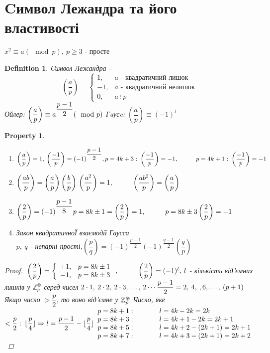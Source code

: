 \documentclass[a4paper,12pt, centered]{bookest}
\newtheorem{definition}{Definition}[section]
\newtheorem*{property*}{Property}
\newcommand\tab[1][1cm]{\hspace*{#1}}
\begin{document}
\section{Cимвол Лежандра та його властивості}
$x^2\equiv a(\mod p),\>p\geq 3$ - просте
\begin{definition}Cимвол Лежандра -
	$$\left(\dfrac ap\right)=\left\{\begin{array}{ll}
	1, & a\textrm{ - квадратичний лишок}\\
	-1, & a\textrm{ - квадратичний нелишок}	\\
	0, & a\>\vdots\>p
	\end{array}\right.$$
	Ойлер: $\left(\dfrac ap\right)\equiv a^{\dfrac{p-1}{2}}(\mod p)\\$
	Гaусc: $\left(\dfrac ap\right)\equiv (-1)^l$
\end{definition}
\begin{property*}$ $
	\begin{enumerate}
		\item $\left(\dfrac ap\right)=1,\>\left(\dfrac {-1}p\right)=(-1)^{\dfrac{p-1}{2}},\\ p=4k+3:\>\left(\dfrac {-1}p\right)=-1,\tab p=4k+1:\>\left(\dfrac {-1}p\right)=-1$
		\item $\left(\dfrac {ab}p\right)=\left(\dfrac ap\right)\left(\dfrac bp\right)\\\left(\dfrac {a^2}p\right)=1,\tab \left(\dfrac {ab^2}p\right)=\left(\dfrac ap\right)$
		\item $\left(\dfrac 2p\right)=(-1)^{\dfrac{p-1}{8}}\\p=8k\pm 1=\left(\dfrac 2p\right)=1,\tab p=8k\pm3\left(\dfrac 2p\right)=-1$
		\item Закон квадратичноЇ взаємодії Гаусса\\
			$p,\>q$ - непарні прості,\tab $\left(\dfrac pq\right)=(-1)^{\dfrac{p-1}{2}}(-1)^{\dfrac{q-1}{2}}\left(\dfrac qp\right)$
	\end{enumerate}
	\begin{proof}
		$\\\left(\dfrac 2p\right)=\left\{\begin{array}{ll}
			+1, & p = 8k\pm1\\
			-1, & p = 8k\pm3
		\end{array}\right.,\tab \left(\dfrac 2p\right)=(-1)^l,\>l$ - кількість від'ємних лишків у $\mathbb{Z}_p^{\circledast}$ серед чисел $2\cdot1,\>2\cdot2,\>2\cdot3,\dots,\>2\cdots\dfrac{p-1}{2}=2,\>4,\>,6,\dots,\>(p+1)\\$ Якщо число $>\dfrac p2$, то воно від'ємне у $\mathbb{Z}_p^{\circledast}\\$ Число, яке $<\dfrac p2:\>\lfloor\dfrac p4\rfloor\Rightarrow l=\dfrac{p-1}{2}-\lfloor\dfrac p4\rfloor\\\begin{array}{ll}
			p=8k+1:\tab  & l=4k-2k=2k\\
			p=8k+3:\tab  & l=4k+1-2k=2k+1\\
			p=8k+5:\tab  & l=4k+2-(2k+1)=2k+1\\
			p=8k+7:\tab  & l=4k+3-(2k+1)=2k+2
		\end{array}$
	\end{proof}
\end{property*}
\end{document}
